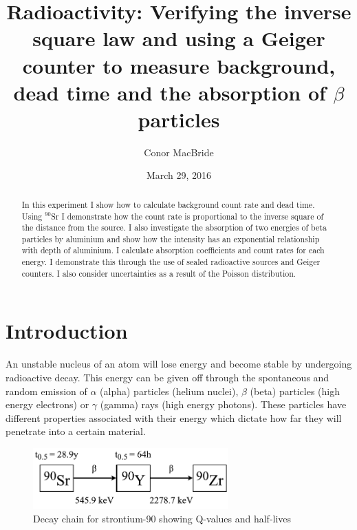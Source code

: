 \documentclass[twocolumn]{revtex4-1}
\begin{document}
\textheight=24.75cm

\title{Radioactivity: Verifying the inverse square law and using a Geiger counter to measure background, dead time and the absorption of $\beta$ particles} 
 
 
 \date{March 29, 2016}
\author{Conor MacBride}


\begin{abstract}
 
In this experiment I show how to calculate background count rate and dead time.
Using $^{90}$Sr I demonstrate how the count rate is proportional to the inverse square of the distance from the source.
I also investigate the absorption of two energies of beta particles by aluminium and show how the intensity has an exponential relationship with depth of aluminium.
I calculate absorption coefficients and count rates for each energy.
I demonstrate this through the use of sealed radioactive sources and Geiger counters.
I also consider uncertainties as a result of the Poisson distribution.

\end{abstract}

\maketitle

\section{Introduction} 
\vspace{-3ex}
 
An unstable nucleus of an atom will lose energy and become stable by undergoing radioactive decay.\cite{gen}
This energy can be given off through the spontaneous and random emission of $\alpha$ (alpha) particles (helium nuclei), $\beta$ (beta) particles (high energy electrons) or $\gamma$ (gamma) rays (high energy photons).
These particles have different properties associated with their energy which dictate how far they will penetrate into a certain material. 

\begin{figure}[!h]
\begin{center}
\includegraphics[width=7.5cm]{chain}
\caption{Decay chain for strontium-90 showing Q-values\cite{Qval} and half-lives\cite{half}}
\label{fig:chain}
\end{center}
\end{figure}
\end{document}
